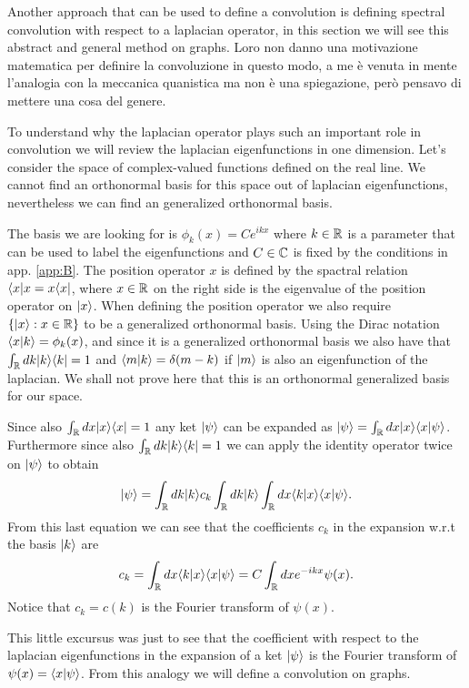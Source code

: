 \documentclass[../3.tex]{subfiles}
\begin{document}
    Another approach that can be used to define a convolution is defining spectral convolution with respect to a laplacian operator, in this section
    we will see this abstract and general method on graphs.
    {\color{red} Loro non danno una motivazione matematica per definire la convoluzione in questo modo, a me è venuta in mente l'analogia con 
    la meccanica quanistica ma non è una spiegazione, però pensavo di mettere una cosa del genere.}

    {\color{blue}

    To understand why the laplacian operator plays such an important role in convolution we will review the laplacian eigenfunctions in one dimension.
    Let's consider the space of complex-valued functions defined on the real line. We cannot find an orthonormal basis for this space out of laplacian
    eigenfunctions, nevertheless we can find an generalized orthonormal basis.

    The basis we are looking for is $\phi_k(x) = C e^{ikx}$ where $k \in \mathbb{R}$ is a parameter that can be used to label the eigenfunctions
    and $C \in \mathbb{C}$ is fixed by the conditions in app. \ref{app:B}.
    The position operator $x$ is defined by the spactral relation $\langle x |x = x\langle x |$, where $x \in \mathbb{R}$ on the right side is the eigenvalue of the position operator
    on $| x \rangle$. When defining the position operator we also require $\{ | x \rangle : x \in \mathbb{R}\}$ to be a generalized orthonormal basis.
    Using the Dirac notation $\langle x | k \rangle = \phi_k(x)$, and since it is a generalized orthonormal basis we also have that
    $\int_{\mathbb{R}} dk | k \rangle\langle k | = 1$ and $\langle m | k \rangle = \delta(m-k)$ if $| m \rangle$ is also an eigenfunction of the laplacian.
    We shall not prove here that this is an orthonormal generalized basis for our space.

    Since also $\int_{\mathbb{R}} dx | x \rangle\langle x | = 1$ any ket $| \psi \rangle$ can be expanded as $| \psi \rangle = \int_{\mathbb{R}} dx | x \rangle\langle x | \psi \rangle$.
    Furthermore since also $\int_{\mathbb{R}} dk | k \rangle \langle k | = 1$ we can apply the identity operator twice on $| \psi \rangle$ to obtain 
    \[ | \psi \rangle = \int_{\mathbb{R}} dk | k \rangle c_k \int_{\mathbb{R}} dk | k \rangle \int_{\mathbb{R}} dx \langle k | x \rangle \langle x | \psi \rangle. \]
    From this last equation we can see that the coefficients $c_k$ in the expansion w.r.t the basis $| k \rangle$ are 
    \[ c_k = \int_{\mathbb{R}} dx \langle k | x \rangle \langle x | \psi \rangle = C \int_{\mathbb{R}} dx e^{-ikx} \psi(x). \]
    Notice that $c_k = c(k)$ is the Fourier transform of $\psi(x)$.

    This little excursus was just to see that the coefficient with respect to the laplacian eigenfunctions in the expansion of a ket $| \psi \rangle$ 
    is the Fourier transform of $\psi(x) = \langle x | \psi \rangle$. From this analogy we will define a convolution on graphs.

}
\end{document}
